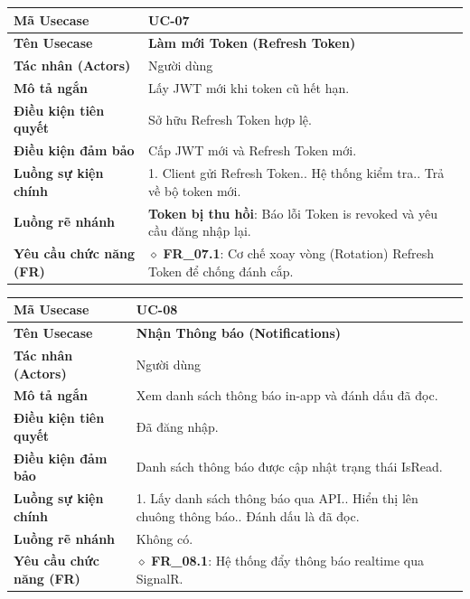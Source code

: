 \begin{table}[H]
\renewcommand{\arraystretch}{1.3}
\centering
\begin{tabularx}{\textwidth}{|p{4.5cm}|X|}
\hline
\cellcolor{gray!15}\bfseries Mã Usecase & \textbf{UC-07} \\ \hline
\cellcolor{gray!15}\bfseries Tên Usecase & \textbf{Làm mới Token (Refresh Token)} \\ \hline
\cellcolor{gray!15}\bfseries Tác nhân (Actors) & Người dùng \\ \hline
\cellcolor{gray!15}\bfseries Mô tả ngắn & Lấy JWT mới khi token cũ hết hạn. \\ \hline
\cellcolor{gray!15}\bfseries Điều kiện tiên quyết & Sở hữu Refresh Token hợp lệ. \\ \hline
\cellcolor{gray!15}\bfseries Điều kiện đảm bảo & Cấp JWT mới và Refresh Token mới. \\ \hline
\cellcolor{gray!15}\bfseries Luồng sự kiện chính & 1. Client gửi Refresh Token.\newline 2. Hệ thống kiểm tra.\newline 3. Trả về bộ token mới. \\ \hline
\cellcolor{gray!15}\bfseries Luồng rẽ nhánh & \textbf{Token bị thu hồi}: Báo lỗi Token is revoked và yêu cầu đăng nhập lại. \\ \hline
\cellcolor{gray!15}\bfseries Yêu cầu chức năng (FR) & $\diamond$ \textbf{FR\_07.1}: Cơ chế xoay vòng (Rotation) Refresh Token để chống đánh cắp. \\ \hline
\end{tabularx}
\end{table}

\begin{table}[H]
\renewcommand{\arraystretch}{1.3}
\centering
\begin{tabularx}{\textwidth}{|p{4.5cm}|X|}
\hline
\cellcolor{gray!15}\bfseries Mã Usecase & \textbf{UC-08} \\ \hline
\cellcolor{gray!15}\bfseries Tên Usecase & \textbf{Nhận Thông báo (Notifications)} \\ \hline
\cellcolor{gray!15}\bfseries Tác nhân (Actors) & Người dùng \\ \hline
\cellcolor{gray!15}\bfseries Mô tả ngắn & Xem danh sách thông báo in-app và đánh dấu đã đọc. \\ \hline
\cellcolor{gray!15}\bfseries Điều kiện tiên quyết & Đã đăng nhập. \\ \hline
\cellcolor{gray!15}\bfseries Điều kiện đảm bảo & Danh sách thông báo được cập nhật trạng thái IsRead. \\ \hline
\cellcolor{gray!15}\bfseries Luồng sự kiện chính & 1. Lấy danh sách thông báo qua API.\newline 2. Hiển thị lên chuông thông báo.\newline 3. Đánh dấu là đã đọc. \\ \hline
\cellcolor{gray!15}\bfseries Luồng rẽ nhánh & Không có. \\ \hline
\cellcolor{gray!15}\bfseries Yêu cầu chức năng (FR) & $\diamond$ \textbf{FR\_08.1}: Hệ thống đẩy thông báo realtime qua SignalR. \\ \hline
\end{tabularx}
\end{table}

